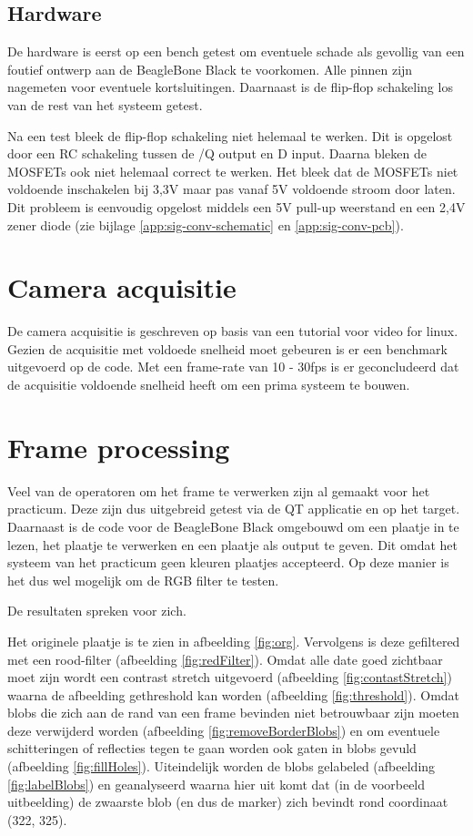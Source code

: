 \subsection{Hardware}
\label{sub:gpioHard}

De hardware is eerst op een bench getest om eventuele schade als gevollig van
een foutief ontwerp aan de BeagleBone Black te voorkomen. Alle pinnen zijn
nagemeten voor eventuele kortsluitingen. Daarnaast is de flip-flop schakeling
los van de rest van het systeem getest.

Na een test bleek de flip-flop schakeling niet helemaal te werken. Dit is opgelost
door een RC schakeling tussen de /Q output en D input. Daarna bleken de MOSFETs
ook niet helemaal correct te werken. Het bleek dat de MOSFETs niet voldoende
inschakelen bij 3,3V maar pas vanaf 5V voldoende stroom door laten. Dit probleem
is eenvoudig opgelost middels een 5V pull-up weerstand en een 2,4V zener diode
(zie bijlage \ref{app:sig-conv-schematic} en \ref{app:sig-conv-pcb}).

\section{Camera acquisitie}
\label{sec:camAcq}

De camera acquisitie is geschreven op basis van een tutorial voor video for
linux. Gezien de acquisitie met voldoede snelheid moet gebeuren is er een
benchmark uitgevoerd op de code. Met een frame-rate van 10 - 30fps is er
geconcludeerd dat de acquisitie voldoende snelheid heeft om een prima
systeem te bouwen.

\section{Frame processing}
\label{sec:framePross}

Veel van de operatoren om het frame te verwerken zijn al gemaakt voor het
practicum. Deze zijn dus uitgebreid getest via de QT applicatie en op het
target. Daarnaast is de code voor de BeagleBone Black omgebouwd om een
plaatje in te lezen, het plaatje te verwerken en een plaatje als output
te geven. Dit omdat het systeem van het practicum geen kleuren plaatjes
accepteerd. Op deze manier is het dus wel mogelijk om de RGB filter te
testen.

De resultaten spreken voor zich.

Het originele plaatje is te zien in afbeelding \ref{fig:org}. Vervolgens is deze
gefiltered met een rood-filter (afbeelding \ref{fig:redFilter}). Omdat alle date
goed zichtbaar moet zijn wordt een contrast stretch uitgevoerd (afbeelding \ref{fig:contastStretch})
waarna de afbeelding gethreshold kan worden (afbeelding \ref{fig:threshold}).
Omdat blobs die zich aan de rand van een frame bevinden niet betrouwbaar zijn
moeten deze verwijderd worden (afbeelding \ref{fig:removeBorderBlobs}) en om
eventuele schitteringen of reflecties tegen te gaan worden ook gaten in blobs
gevuld (afbeelding \ref{fig:fillHoles}). Uiteindelijk worden de blobs gelabeled
(afbeelding \ref{fig:labelBlobs}) en geanalyseerd waarna hier uit komt dat
(in de voorbeeld uitbeelding) de zwaarste blob (en dus de marker) zich bevindt
rond coordinaat (322, 325).

